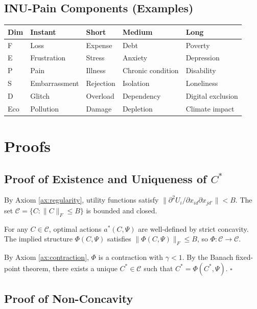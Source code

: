 \documentclass[12pt,a4paper]{article}
\begin{document}
\subsection{INU-Pain Components (Examples)}

\begin{center}
\renewcommand{\arraystretch}{1.1}
\begin{tabular}{lllll}
\hline
\textbf{Dim} & \textbf{Instant} & \textbf{Short} & \textbf{Medium} & \textbf{Long} \\
\hline
F & Loss & Expense & Debt & Poverty \\
E & Frustration & Stress & Anxiety & Depression \\
P & Pain & Illness & Chronic condition & Disability \\
S & Embarrassment & Rejection & Isolation & Loneliness \\
D & Glitch & Overload & Dependency & Digital exclusion \\
Eco & Pollution & Damage & Depletion & Climate impact \\
\hline
\end{tabular}
\end{center}

\section{Proofs}
\label{app:proofs}

\subsection{Proof of Existence and Uniqueness of $C^*$}

By Axiom \ref{ax:regularity}, utility functions satisfy 
$\|\partial^2 U_i / \partial x_{id} \partial x_{jd'}\| < B$.
The set $\mathcal{C} = \{C : \|C\|_F \leq B\}$ is bounded and closed.

For any $C \in \mathcal{C}$, optimal actions $a^*(C, \Psi)$ are well-defined
by strict concavity. The implied structure $\Phi(C, \Psi)$ satisfies
$\|\Phi(C, \Psi)\|_F \leq B$, so $\Phi: \mathcal{C} \to \mathcal{C}$.

By Axiom \ref{ax:contraction}, $\Phi$ is a contraction with $\gamma < 1$.
By the Banach fixed-point theorem, there exists a unique $C^* \in \mathcal{C}$
such that $C^* = \Phi(C^*, \Psi)$. \hfill $\square$

\subsection{Proof of Non-Concavity}
\end{document}
